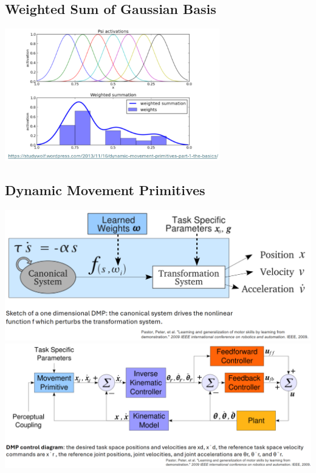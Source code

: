 \documentclass[10pt]{article}
\begin{document}
\subsection*{Weighted Sum of Gaussian Basis}
\begin{center} 
	\includegraphics*[width=0.7\textwidth]{L1_7.png} 
\end{center}

\subsection*{Dynamic Movement Primitives}
\begin{center} 
	\includegraphics*[width=\textwidth]{L1_8.png} \\
    \includegraphics*[width=\textwidth]{L1_9.png} 
\end{center}
\end{document}
